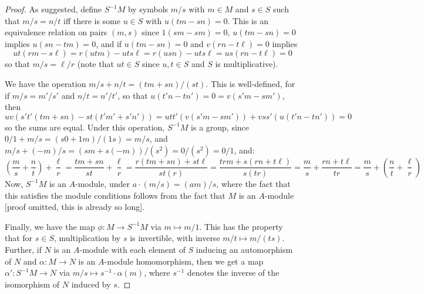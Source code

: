 \documentclass[12pt]{exam}
\begin{document}
\begin{proof}
	As suggested, define $S^{-1}M$ by symbols $m/s$ with $m \in M$ and $s \in S$ such that $m/s = n/t$ iff there is some $u \in S$ with $u(tm-sn) = 0$. This is an equivalence relation on pairs $(m,s)$ since $1(sm-sm) = 0$, $u(tm-sn) = 0$ implies $u(sn-tm) = 0$, and if $u(tm-sn) = 0$ and $v(rn-t\ell)=0$ implies
	\[ ut(rm-s\ell) = r(utm)-uts\ell = r(usn)-uts\ell = us(rn-t\ell) = 0 \]
	so that $m/s = \ell/r$ (note that $ut \in S$ since $u,t \in S$ and $S$ is multiplicative).
	
	We have the operation $m/s + n/t = (tm+sn)/(st)$. This is well-defined, for if $m/s = m'/s'$ and $n/t = n'/t'$, so that $u(t'n - tn') = 0 = v(s'm - sm')$, then
	\[ uv(s't'(tm+sn) - st(t'm'+s'n')) = utt'(v(s'm-sm')) + vss'(u(t'n-tn')) = 0 \]
	so the sums are equal. Under this operation, $S^{-1}M$ is a group, since $0/1 + m/s = (s0 + 1m)/(1s) = m/s$, and $m/s + (-m)/s = (sm + s(-m))/(s^2) = 0/(s^2) = 0/1$, and:
	\[ \left(\frac{m}{s}+\frac{n}{t}\right)+\frac{\ell}{r} = \frac{tm+sn}{st}+\frac{\ell}{r} = \frac{r(tm+sn)+st\ell}{st(r)} = \frac{trm + s(rn+t\ell)}{s(tr)} = \frac{m}{s}+\frac{rn+t\ell}{tr} = \frac{m}{s}+\left(\frac{n}{t}+\frac{\ell}{r}\right) \]
	Now, $S^{-1}M$ is an $A$-module, under $a \cdot (m/s) = (am)/s$, where the fact that this satisfies the module conditions follows from the fact that $M$ is an $A$-module [proof omitted, this is already so long].
	
	Finally, we have the map $\phi : M \to S^{-1}M$ via $m \mapsto m/1$. This has the property that for $s \in S$, multiplication by $s$ is invertible, with inverse $m/t \mapsto m/(ts)$. Further, if $N$ is an $A$-module with each element of $S$ inducing an automorphism of $N$ and $\alpha : M \to N$ is an $A$-module homomorphism, then we get a map $\alpha' : S^{-1}M \to N$ via $m/s \mapsto s^{-1} \cdot \alpha(m)$, where $s^{-1}$ denotes the inverse of the isomorphism of $N$ induced by $s$.
\end{proof}
\end{document}
